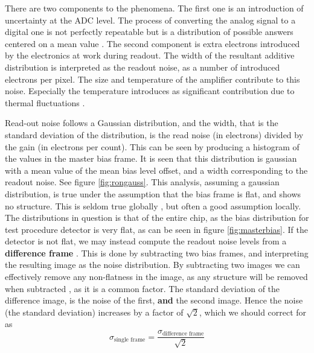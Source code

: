\documentclass[../main.tex]{subfiles}
\begin{document}
	There are two components to the phenomena. The first one is an introduction of uncertainty at the ADC level. The process of converting the analog signal to a digital one is not perfectly repeatable but is a distribution of possible answers centered on a mean value \cite{handbookofccdastronomy}.
	The second component is extra electrons introduced by the electronics at work during readout. The width of the resultant additive distribution is interpreted as the readout noise, as a number of introduced electrons per pixel.
	The size and temperature of the amplifier contribute to this noise. Especially the temperature introduces as significant contribution due to thermal fluctuations \cite{handbookofccdastronomy}. 
	
	Read-out noise follows a Gaussian distribution, and the width, that is the standard deviation of the distribution, is the read noise (in electrons) divided by the gain (in electrons per count). This can be seen by producing a histogram of the values in the master bias frame. It is seen that this distribution is gaussian with a mean value of the mean bias level offset, and a width corresponding to the readout noise. See figure \ref{fig:rongauss}. This analysis, assuming a gaussian distribution, is true under the assumption that the bias frame is flat, and shows no structure. This is seldom true globally \cite{handbookofccdastronomy}, but often a good assumption locally. The distributions in question is that of the entire chip, as the bias distribution for test procedure detector is very flat, as can be seen in figure \ref{fig:masterbias}. If the detector is not flat, we may instead compute the readout noise levels from a \textbf{difference frame} \cite{obsAstMichrichReadout}. This is done by subtracting two bias frames, and interpreting the resulting image as the noise distribution. By subtracting two images we can effectively remove any non-flatness in the image, as any structure will be removed when subtracted \cite{obsAstMichrichReadout}, as it is a common factor. The standard deviation of the difference image, is the noise of the first, \textbf{and} the second image. Hence the noise (the standard deviation) increases by a factor of $\sqrt{2}$, which we should correct for as \cite{obsAstMichrichReadout}
	\begin{equation}
		\sigma_\text{single frame} = \frac{\sigma_\text{difference frame}}{\sqrt{2}}
	\end{equation}
	
\end{document}
